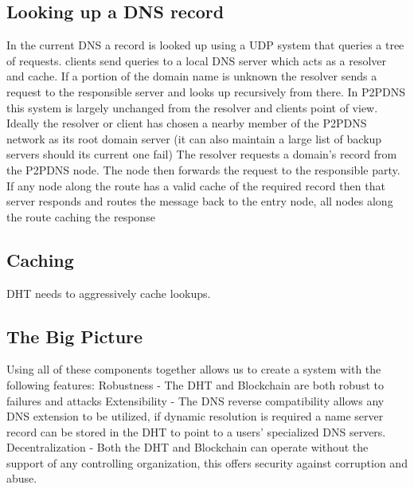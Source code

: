\documentclass[11pt]{ieeetran} %
\begin{document}
\subsection{Looking up a DNS record}
In the current DNS a record is looked up using a UDP system that queries a tree of requests. clients send queries to a local DNS server which acts as a resolver and cache. If a portion of the domain name is unknown the resolver sends a request to the responsible server and looks up recursively from there.
In P2PDNS this system is largely unchanged from the resolver and clients point of view. Ideally the resolver or client has chosen a nearby member of the P2PDNS network as its root domain server (it can also maintain a large list of backup servers should its current one fail) The resolver requests a domain’s record from the P2PDNS node. The node then forwards the request to the responsible party. If any node along the route has a valid cache of the required record then that server responds and routes the message back to the entry node, all nodes along the route caching the response

\subsection{Caching}

DHT needs to aggressively cache lookups.  \cite{irm}

\subsection{The Big Picture}
Using all of these components together allows us to create a system with the following features:
Robustness - The DHT and Blockchain are both robust to failures and attacks
Extensibility - The DNS reverse compatibility allows any DNS extension to be utilized, if dynamic resolution is required a name server record can be stored in the DHT to point to a users’ specialized DNS servers.
Decentralization - Both the DHT and Blockchain can operate without the support of any controlling organization, this offers security against corruption and abuse.
	


\end{document}
